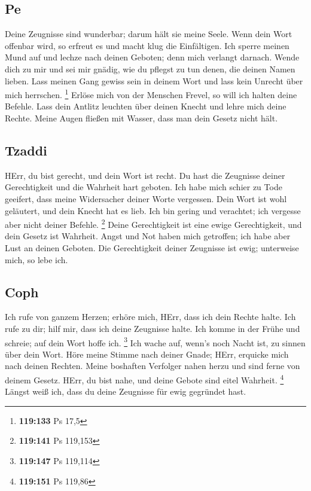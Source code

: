 \hypertarget{pe}{%
\subsection{Pe}\label{pe}}

 Deine Zeugnisse sind wunderbar; darum hält sie meine
Seele.  Wenn dein Wort offenbar wird, so erfreut es und
macht klug die Einfältigen.  Ich sperre meinen Mund auf
und lechze nach deinen Geboten; denn mich verlangt darnach.
 Wende dich zu mir und sei mir gnädig, wie du pflegst zu
tun denen, die deinen Namen lieben.  Lass meinen Gang
gewiss sein in deinem Wort und lass kein Unrecht über mich herrschen.
\footnote{\textbf{119:133} Ps 17,5}  Erlöse mich von der
Menschen Frevel, so will ich halten deine Befehle.  Lass
dein Antlitz leuchten über deinen Knecht und lehre mich deine Rechte.
 Meine Augen fließen mit Wasser, dass man dein Gesetz
nicht hält.

\hypertarget{tzaddi}{%
\subsection{Tzaddi}\label{tzaddi}}

 HErr, du bist gerecht, und dein Wort ist recht.
 Du hast die Zeugnisse deiner Gerechtigkeit und die
Wahrheit hart geboten.  Ich habe mich schier zu Tode
geeifert, dass meine Widersacher deiner Worte vergessen.
 Dein Wort ist wohl geläutert, und dein Knecht hat es
lieb.  Ich bin gering und verachtet; ich vergesse aber
nicht deiner Befehle. \footnote{\textbf{119:141} Ps 119,153}
 Deine Gerechtigkeit ist eine ewige Gerechtigkeit, und
dein Gesetz ist Wahrheit.  Angst und Not haben mich
getroffen; ich habe aber Lust an deinen Geboten.  Die
Gerechtigkeit deiner Zeugnisse ist ewig; unterweise mich, so lebe ich.

\hypertarget{coph}{%
\subsection{Coph}\label{coph}}

 Ich rufe von ganzem Herzen; erhöre mich, HErr, dass ich
dein Rechte halte.  Ich rufe zu dir; hilf mir, dass ich
deine Zeugnisse halte.  Ich komme in der Frühe und
schreie; auf dein Wort hoffe ich. \footnote{\textbf{119:147} Ps 119,114}
 Ich wache auf, wenn's noch Nacht ist, zu sinnen über
dein Wort.  Höre meine Stimme nach deiner Gnade; HErr,
erquicke mich nach deinen Rechten.  Meine boshaften
Verfolger nahen herzu und sind ferne von deinem Gesetz. 
HErr, du bist nahe, und deine Gebote sind eitel Wahrheit. \footnote{\textbf{119:151}
  Ps 119,86}  Längst weiß ich, dass du deine Zeugnisse
für ewig gegründet hast.

